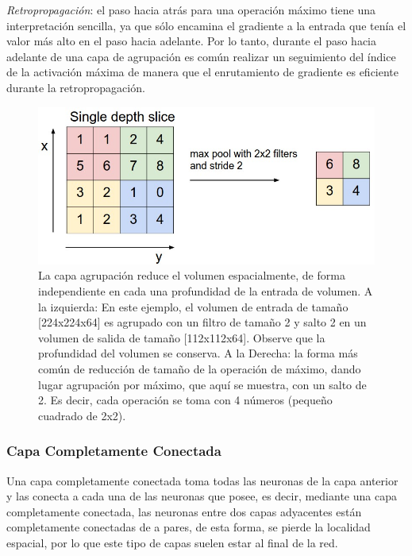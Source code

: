 \documentclass[a4paper,11pt,spanish]{book}
\begin{document}
	\emph{Retropropagación}: el paso hacia atrás para una operación máximo tiene una interpretación sencilla, ya que sólo encamina el gradiente a la entrada que tenía el valor más alto
	en el paso hacia adelante. Por lo tanto, durante el paso hacia adelante de una capa de agrupación es común realizar un seguimiento del índice de la activación máxima de
	manera que el enrutamiento de gradiente es eficiente durante la retropropagación.

	\begin{figure}[H]
	  \begin{center}
	   \includegraphics[width=0.8\linewidth]{./img/stanford_maxpool.jpeg}
	  \end{center}
	  \caption{La capa agrupación reduce el volumen espacialmente, de forma independiente en cada una profundidad de la entrada de volumen.
	    A la izquierda: En este ejemplo, el volumen de entrada de tamaño [224x224x64] es agrupado con un filtro de tamaño 2 y salto 2 en un volumen de salida de tamaño [112x112x64].
	    Observe que la profundidad del volumen se conserva. A la Derecha: la forma más común de reducción de tamaño de la operación de máximo, dando lugar agrupación por máximo,
	    que aquí se muestra, con un salto de 2. Es decir, cada operación se toma con 4 números (pequeño cuadrado de 2x2). \cite{Karpathy:Stanford}}
	  \label{fig:maxpool_layer}
	\end{figure}

      \subsubsection{Capa Completamente Conectada}
	Una capa completamente conectada toma todas las neuronas de la capa anterior y las conecta a cada una de las neuronas que posee, es decir, 
	mediante una capa completamente conectada, las neuronas entre dos capas adyacentes están completamente conectadas de a pares, de esta forma, se pierde la localidad espacial,
	por lo que este tipo de capas suelen estar al final de la red.
\end{document}
